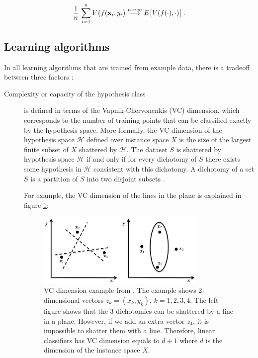 \begin{equation}
\frac1n\,\sum_{i=1}^n V\big( f(\mathbf{x}_i,y_i \big)
\overset{n\to\infty}{\longrightarrow} E\big[ V(f(\cdot),\cdot)\big]\,.
\end{equation}


\subsection{Learning algorithms}
In all learning algorithms that are trained from example data, there is a
tradeoff between three factors \cite{dietterich2003}:
\begin{description}
\item[Complexity or capacity of the hypothesis class] is defined in terms of the
Vapnik-Chervonenkis (VC) dimension, which corresponds to the number of training
points that can be classified exactly by the hypothesis space. More formally,
the VC dimension of the hypothesis space $\mathscr{H}$ defined over instance
space $X$ is the size of the largest finite subset of $X$ shattered by
$\mathscr{H}$. The dataset $S$ is shattered by hypothesis space $\mathscr{H}$ if
and only if for every dichotomy of $S$ there exists some hypothesis in
$\mathscr{H}$ consistent with this dichotomy. A dichotomy of a set $S$ is a
partition of $S$ into two disjoint subsets \cite{vapnik2013nature}.

For example, the VC dimension of the lines in the plane is explained in figure
\ref{fig:vcdimension}:


\begin{figure}[!h]
  \centering
  \includegraphics[width=0.8\textwidth]{img/VCdimension}
  \caption[VC dimension example]{VC dimension example from \cite{vapnik2013nature}. The example shows 2-dimensional vectors $z_k=(x_k,y_k)$,  $k=1,2,3,4$. The left figure
  shows that the 3 dichotomies can be shattered by a line in a plane. However, if we
  add an extra vector $z_4$, it is impossible to shatter them with a
  line. Therefore, linear classifiers has VC dimension equals to $d+1$ where $d$
  is the dimension of the instance space $X$.}
  \label{fig:vcdimension}
\end{figure}


\end{description}
